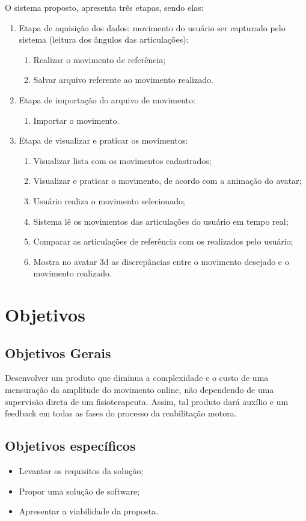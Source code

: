   O sistema proposto, apresenta três etapas, sendo elas:
  \begin{enumerate}
  \item Etapa de aquisição dos dados: movimento do usuário ser capturado pelo sistema (leitura dos ângulos das articulações):
    \begin{enumerate}
    \item Realizar o movimento de referência;
    \item Salvar arquivo referente ao movimento realizado.
    \end{enumerate}
  \item Etapa de importação do arquivo de movimento:
  \begin{enumerate}
      \item Importar o movimento.
  \end{enumerate}
  \item Etapa de visualizar e praticar os movimentos:
    \begin{enumerate}
    \item Visualizar lista com os movimentos cadastrados;
    \item Visualizar e praticar o movimento, de acordo com a animação do avatar;
    \item Usuário realiza o movimento selecionado;
    \item Sistema lê os movimentos das articulações do usuário em tempo real;
    \item Comparar as articulações de referência com os realizados pelo usuário;
    \item Mostra no avatar 3d as discrepâncias entre o movimento desejado e o movimento realizado.
    \end{enumerate}
  \end{enumerate}
\section{Objetivos}
\label{Sec:Objetivos}
\subsection{Objetivos Gerais}
\label{Sub:ObjetivosGerais}
  Desenvolver um produto que diminua a complexidade e o custo de uma mensuração
da amplitude do movimento online, não dependendo de uma supervisão direta de um fisioterapeuta.
Assim, tal produto dará auxílio e um feedback em todas as fases do processo da reabilitação motora.

\subsection{Objetivos específicos}
\label{Sub:ObjetivosEspecificos}
\begin{itemize}

\item Levantar os requisitos da solução;
\item Propor uma solução de software;
\item Apresentar a viabilidade da proposta.

\end{itemize}

